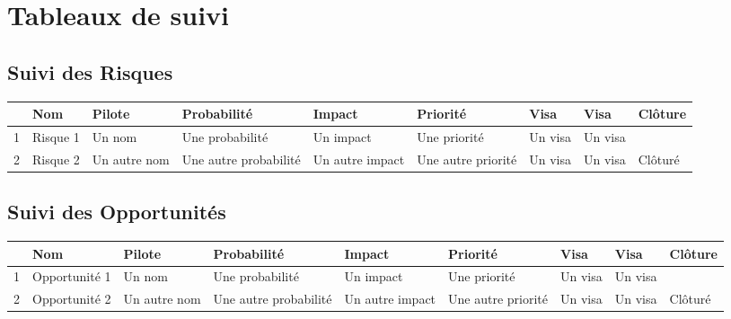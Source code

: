 

\section*{Tableaux de suivi}


\subsection*{Suivi des Risques}
\begin{longtable}{|p{0.3cm}|p{2.5cm}|p{2cm}|p{2cm}|p{1.8cm}|p{1.5cm}|p{1cm}|p{1cm}|p{1.5cm}|}
			\hline
			\rowcolor{gray!40}
			\No & Nom & Pilote & Probabilité & Impact & Priorité & Visa \RQCourt{} & Visa \CPCourt{} & Clôture \\\hline
			
			 1 & Risque 1 & Un nom & Une probabilité & Un impact & Une priorité & Un visa & Un visa & \\\hline
			 
			 2 & Risque 2 & Un autre nom & Une autre probabilité & Un autre impact & Une autre priorité & Un visa & Un visa & Clôturé \\\hline
			 
			 
\end{longtable}

\subsection*{Suivi des Opportunités}

\begin{longtable}{|p{0.3cm}|p{2.5cm}|p{2cm}|p{2cm}|p{1.8cm}|p{1.5cm}|p{1cm}|p{1cm}|p{1.5cm}|}
			\hline
			\rowcolor{gray!40}
			\No & Nom & Pilote & Probabilité & Impact & Priorité & Visa \RQCourt{} & Visa \CPCourt{} & Clôture \\\hline
			 
			 1 & Opportunité 1 & Un nom & Une probabilité & Un impact & Une priorité & Un visa & Un visa & \\\hline
			 
			 2 & Opportunité 2 & Un autre nom & Une autre probabilité & Un autre impact & Une autre priorité & Un visa & Un visa & Clôturé \\\hline
			 			 
\end{longtable}

